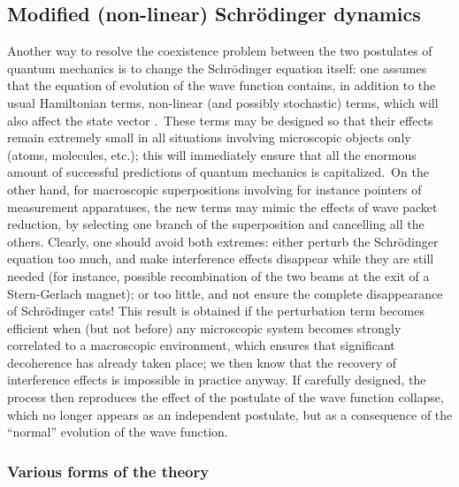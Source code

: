 \documentclass[12pt,onecolumn]{article}%
\begin{document}
\subsection{Modified (non-linear) Schr\"{o}dinger dynamics}

\label{stoch}

Another way to resolve the coexistence problem between the two postulates of
quantum mechanics is to change the Schr\"{o}dinger equation itself: one
assumes that the equation of evolution of the wave function contains, in
addition to the usual Hamiltonian terms, non-linear (and possibly stochastic)
terms, which will also affect the state vector \cite{Bohm-Bub-1} \cite{Pearle}
\cite{Ghirardi} \cite{stochastic} \cite{Diosi}.\ These terms may be designed
so that their effects remain extremely small in all situations involving
microscopic objects only (atoms, molecules, etc.); this will immediately
ensure that all the enormous amount of successful predictions of quantum
mechanics is capitalized.\ On the other hand, for macroscopic superpositions
involving for instance pointers of measurement apparatuses, the new terms may
mimic the effects of wave packet reduction, by selecting one branch of the
superposition and cancelling all the others. Clearly, one should avoid both
extremes: either perturb the Schr\"{o}dinger equation too much, and make
interference effects disappear while they are still needed (for instance,
possible recombination of the two beams at the exit of a Stern-Gerlach
magnet); or too little, and not ensure the complete disappearance of
Schr\"{o}dinger cats! This result is obtained if the perturbation term becomes
efficient when (but not before) any microscopic system becomes strongly
correlated to a macroscopic environment, which ensures that significant
decoherence has already taken place; we then know that the recovery of
interference effects is impossible in practice anyway. If carefully designed,
the process then reproduces the effect of the postulate of the wave function
collapse, which no longer appears as an independent postulate, but as a
consequence of the ``normal'' evolution of the wave function.

\subsubsection{Various forms of the theory}
\end{document}
